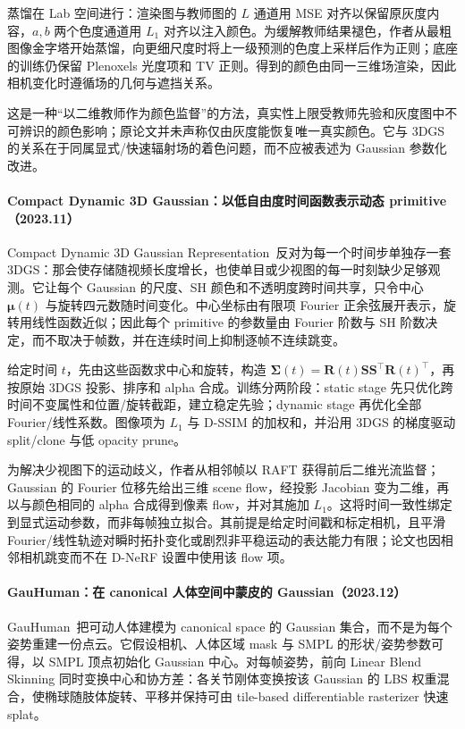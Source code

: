 蒸馏在 Lab 空间进行：渲染图与教师图的 $L$ 通道用 MSE 对齐以保留原灰度内容，$a,b$ 两个色度通道用 $L_1$ 对齐以注入颜色。为缓解教师结果褪色，作者从最粗图像金字塔开始蒸馏，向更细尺度时将上一级预测的色度上采样后作为正则；底座的训练仍保留 Plenoxels 光度项和 TV 正则。得到的颜色由同一三维场渲染，因此相机变化时遵循场的几何与遮挡关系。

这是一种“以二维教师作为颜色监督”的方法，真实性上限受教师先验和灰度图中不可辨识的颜色影响；原论文并未声称仅由灰度能恢复唯一真实颜色。它与 3DGS 的关系在于同属显式/快速辐射场的着色问题，而不应被表述为 Gaussian 参数化改进。


\paragraph{Compact Dynamic 3D Gaussian：以低自由度时间函数表示动态 primitive（2023.11）}
Compact Dynamic 3D Gaussian Representation~\cite{2311_12897}反对为每一个时间步单独存一套 3DGS：那会使存储随视频长度增长，也使单目或少视图的每一时刻缺少足够观测。它让每个 Gaussian 的尺度、SH 颜色和不透明度跨时间共享，只令中心 $\boldsymbol\mu(t)$ 与旋转四元数随时间变化。中心坐标由有限项 Fourier 正余弦展开表示，旋转用线性函数近似；因此每个 primitive 的参数量由 Fourier 阶数与 SH 阶数决定，而不取决于帧数，并在连续时间上抑制逐帧不连续跳变。

给定时间 $t$，先由这些函数求中心和旋转，构造 $\boldsymbol\Sigma(t)=\mathbf R(t)\mathbf S\mathbf S^\top\mathbf R(t)^\top$，再按原始 3DGS 投影、排序和 alpha 合成。训练分两阶段：static stage 先只优化跨时间不变属性和位置/旋转截距，建立稳定先验；dynamic stage 再优化全部 Fourier/线性系数。图像项为 $L_1$ 与 D-SSIM 的加权和，并沿用 3DGS 的梯度驱动 split/clone 与低 opacity prune。

为解决少视图下的运动歧义，作者从相邻帧以 RAFT 获得前后二维光流监督；Gaussian 的 Fourier 位移先给出三维 scene flow，经投影 Jacobian 变为二维，再以与颜色相同的 alpha 合成得到像素 flow，并对其施加 $L_1$。这将时间一致性绑定到显式运动参数，而非每帧独立拟合。其前提是给定时间戳和标定相机，且平滑 Fourier/线性轨迹对瞬时拓扑变化或剧烈非平稳运动的表达能力有限；论文也因相邻相机跳变而不在 D-NeRF 设置中使用该 flow 项。


\paragraph{GauHuman：在 canonical 人体空间中蒙皮的 Gaussian（2023.12）}
GauHuman~\cite{2312_02973}把可动人体建模为 canonical space 的 Gaussian 集合，而不是为每个姿势重建一份点云。它假设相机、人体区域 mask 与 SMPL 的形状/姿势参数可得，以 SMPL 顶点初始化 Gaussian 中心。对每帧姿势，前向 Linear Blend Skinning 同时变换中心和协方差：各关节刚体变换按该 Gaussian 的 LBS 权重混合，使椭球随肢体旋转、平移并保持可由 tile-based differentiable rasterizer 快速 splat。

